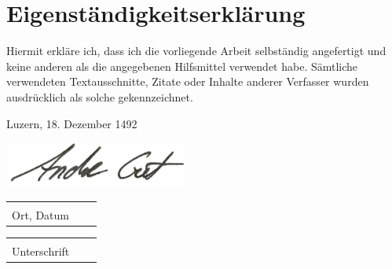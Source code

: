 \section*{Eigenständigkeitserklärung}

Hiermit erkläre ich, dass ich die vorliegende Arbeit selbständig angefertigt und keine anderen als die angegebenen Hilfsmittel verwendet habe. Sämtliche verwendeten Textausschnitte, Zitate oder Inhalte anderer Verfasser wurden ausdrücklich als solche gekennzeichnet.

\vspace{1 cm}

\begin{minipage}[t]{0.31\linewidth}
	\centering
	Luzern, 18. Dezember 1492
\end{minipage}
\hfill
\begin{minipage}[t]{0.45\linewidth}
	\includegraphics[width=0.45\textwidth]{04_Figures/Unterschrift2.png}
\end{minipage}


\vspace{-0.5 cm}
\begin{tabular}{p{7cm}p{.5cm}l}
	\dotfill \\
	Ort, Datum
\end{tabular}
\vspace{1,5 cm}
\begin{tabular}{p{7cm}p{.5cm}l}
	\dotfill \\
Unterschrift
\end{tabular}
\hfill
